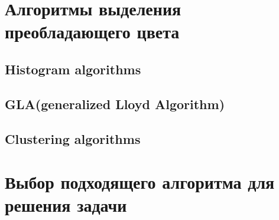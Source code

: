\section{ Алгоритмы выделения преобладающего цвета}
\subsection{ Histogram algorithms}
\subsection{ GLA(generalized Lloyd Algorithm)}
\subsection{ Clustering algorithms}

\section{ Выбор подходящего алгоритма для решения задачи}
